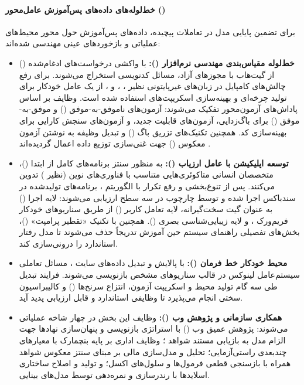 \paragraph*{خط‌لوله‌های داده‌های پس‌آموزش عامل‌محور ()}
برای تضمین پایایی مدل در تعاملات پیچیده، داده‌های پس‌آموزش حول محور محیط‌های عملیاتی و بازخوردهای عینی مهندسی شده‌اند:
\begin{itemize}
    \item \textbf{خط‌لوله مقیاس‌بندی مهندسی نرم‌افزار ():} با واکشی درخواست‌های ادغام‌شده () از گیت‌هاب با مجوزهای آزاد، مسائل کدنویسی استخراج می‌شوند. برای رفع چالش‌های کامپایل در زبان‌های غیرپایتونی نظیر  ، ، و ، از یک عامل خودکار برای تولید چرخه‌ای و بهینه‌سازی اسکریپت‌های  استفاده شده است. وظایف بر اساس پاداش‌های آزمون‌محور تفکیک می‌شوند: آزمون‌های ناموفق-به-موفق () و موفق-به-موفق () برای باگ‌زدایی، آزمون‌های قابلیت جدید، و آزمون‌های سنجش کارایی برای بهینه‌سازی کد. همچنین تکنیک‌های تزریق باگ () و تبدیل وظیفه به نوشتن آزمون معکوس () جهت غنی‌سازی توزیع داده اعمال گردیده‌اند \cite{yang2024swesmith}.
    \item \textbf{توسعه اپلیکیشن با عامل ارزیاب ():} به منظور سنتز برنامه‌های کامل از ابتدا ()، متخصصان انسانی متاکوئری‌هایی متناسب با فناوری‌های نوین (نظیر ) تدوین می‌کنند. پس از تنوع‌بخشی و رفع تکرار با الگوریتم ، برنامه‌های تولیدشده در سندباکس اجرا شده و توسط چارچوب  در سه سطح ارزیابی می‌شوند: لایه اجرا () به عنوان گیت سخت‌گیرانه، لایه تعامل کاربر () از طریق سناریوهای خودکار فریم‌ورک ، و لایه زیبایی‌شناسی بصری (). همچنین با تکنیک «تقطیر پرامپت» ()، بخش‌های تفصیلی راهنمای سیستم حین آموزش تدریجاً حذف می‌شوند تا مدل رفتار استاندارد را درونی‌سازی کند.
    \item \textbf{محیط خودکار خط فرمان ():} با پالایش و تبدیل داده‌های سایت  \cite{merrill2026terminalbench}، مسائل تعاملی سیستم‌عامل لینوکس در قالب سناریوهای مشخص بازنویسی می‌شوند. فرایند تبدیل طی سه گام تولید محیط و اسکریپت آزمون، انتزاع سرنخ‌ها () و کالیبراسیون سختی انجام می‌پذیرد تا وظایفی استاندارد و قابل ارزیابی پدید آید.
    \item \textbf{همکاری سازمانی و پژوهش وب ():} وظایف این بخش در چهار شاخه عملیاتی می‌شوند: پژوهش عمیق وب () با استراتژی بازنویسی و پنهان‌سازی نهادها جهت الزام مدل به بازیابی مستند شواهد \cite{liu2025webexplorer}؛ وظایف اداری بر پایه بنچمارک  \cite{patwardhan2025gdpval} با معیارهای چندبعدی راستی‌آزمایی؛ تحلیل و مدل‌سازی مالی بر مبنای سنتز معکوس شواهد \cite{chen2026dive} همراه با بازسنجی قطعی فرمول‌ها و سلول‌های اکسل؛ و تولید و اصلاح ساختاری اسلایدها با رندرسازی و نمره‌دهی توسط مدل‌های بینایی.

\end{itemize}
